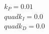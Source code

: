 \documentclass[preview]{standalone}
\begin{document}
\begin{align*}
k_P  = 0.01 \\quad  k_I  = 0.0 \\quad  k_D  = 0.0
\end{align*}
\end{document}
